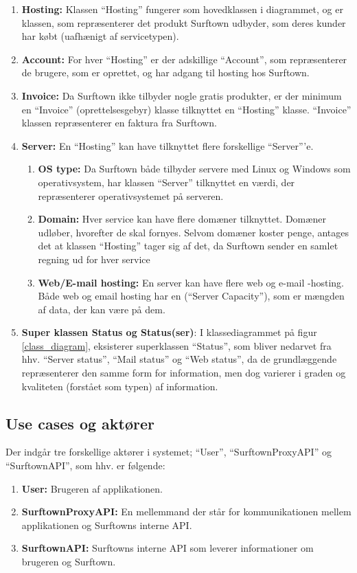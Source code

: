 \documentclass[12pt]{article}
\begin{document}
\begin{enumerate}
	\item{\textbf{Hosting: }Klassen ``Hosting'' fungerer som hovedklassen i diagrammet, og er klassen, som repræsenterer det produkt Surftown udbyder, som deres kunder har købt (uafhænigt af servicetypen).}
	\item{\textbf{Account: }For hver ``Hosting'' er der adskillige ``Account'', som repræsenterer de brugere, som er oprettet, og har adgang til hosting hos Surftown.}
	\item{\textbf{Invoice: }Da Surftown ikke tilbyder nogle gratis produkter, er der minimum en ``Invoice'' (oprettelsesgebyr)  klasse tilknyttet en ``Hosting'' klasse. ``Invoice'' klassen repræsenterer en faktura fra Surftown.}
	\item{\textbf{Server: }En ``Hosting'' kan have tilknyttet flere forskellige ``Server'''e.
	}\begin{enumerate}
		\item{\textbf{OS type: }Da Surftown både tilbyder servere med Linux og Windows som operativsystem, har klassen ``Server'' tilknyttet en værdi, der repræsenterer operativsystemet på serveren.}
		\item{\textbf{Domain: }Hver service kan have flere domæner tilknyttet. Domæner udløber, hvorefter de skal fornyes. Selvom domæner koster penge, antages det at klassen ``Hosting'' tager sig af det, da Surftown sender en samlet regning ud for hver service}
	\item{\textbf{Web/E-mail hosting: } En server kan have flere web og e-mail -hosting. Både web og email hosting har en (``Server Capacity''), som er mængden af data, der kan være på dem.}
	\end{enumerate}
	\item{\textbf{Super klassen Status og Status(ser)}: } I klassediagrammet på figur~ \ref{class_diagram}, eksisterer superklassen ``Status'', som bliver nedarvet fra hhv. ``Server status'', ``Mail status'' og ``Web status'', da de grundlæggende repræsenterer den samme form for information, men dog varierer i graden og kvaliteten (forstået som typen) af information.
\end{enumerate}

\subsection*{Use cases og aktører}
Der indgår tre forskellige aktører i systemet; ``User'', ``SurftownProxyAPI'' og ``SurftownAPI'', som hhv. er følgende:
\begin{enumerate}
	\item{\textbf{User: } Brugeren af applikationen.}
	\item{\textbf{SurftownProxyAPI: } En mellemmand der står for kommunikationen mellem applikationen og Surftowns interne API.}
	\item{\textbf{SurftownAPI: } Surftowns interne API som leverer informationer om brugeren og Surftown.}
\end{enumerate}
\end{document}
